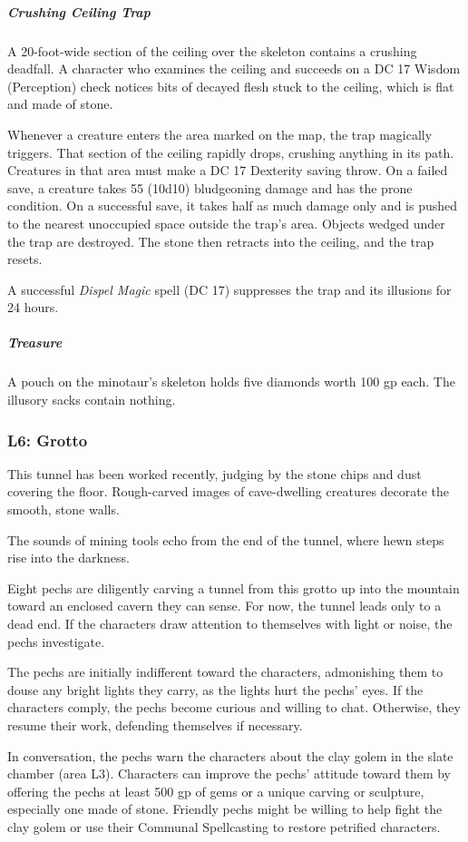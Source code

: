 \documentclass[10pt,a4paper,twoside,bg=print,twocolumn,openany,nodeprecatedcode]{dndbook}
\begin{document}
\subparagraph{Crushing Ceiling Trap}
A 20-foot-wide section of the ceiling over the skeleton contains a crushing deadfall. A character who examines the ceiling and succeeds on a DC 17 Wisdom (Perception) check notices bits of decayed flesh stuck to the ceiling, which is flat and made of stone.

Whenever a creature enters the area marked on the map, the trap magically triggers. That section of the ceiling rapidly drops, crushing anything in its path. Creatures in that area must make a DC 17 Dexterity saving throw. On a failed save, a creature takes 55 (10d10) bludgeoning damage and has the prone condition. On a successful save, it takes half as much damage only and is pushed to the nearest unoccupied space outside the trap's area. Objects wedged under the trap are destroyed. The stone then retracts into the ceiling, and the trap resets.

A successful \textit{Dispel Magic} spell (DC 17) suppresses the trap and its illusions for 24 hours.

\subparagraph{Treasure}
A pouch on the minotaur's skeleton holds five diamonds worth 100 gp each. The illusory sacks contain nothing.

\subsubsection{L6: Grotto}
\begin{DndReadAloud}{}
This tunnel has been worked recently, judging by the stone chips and dust covering the floor. Rough-carved images of cave-dwelling creatures decorate the smooth, stone walls.

The sounds of mining tools echo from the end of the tunnel, where hewn steps rise into the darkness.

\end{DndReadAloud}

Eight pechs are diligently carving a tunnel from this grotto up into the mountain toward an enclosed cavern they can sense. For now, the tunnel leads only to a dead end. If the characters draw attention to themselves with light or noise, the pechs investigate.

The pechs are initially indifferent toward the characters, admonishing them to douse any bright lights they carry, as the lights hurt the pechs' eyes. If the characters comply, the pechs become curious and willing to chat. Otherwise, they resume their work, defending themselves if necessary.

In conversation, the pechs warn the characters about the clay golem in the slate chamber (area L3). Characters can improve the pechs' attitude toward them by offering the pechs at least 500 gp of gems or a unique carving or sculpture, especially one made of stone. Friendly pechs might be willing to help fight the clay golem or use their Communal Spellcasting to restore petrified characters.
\end{document}

